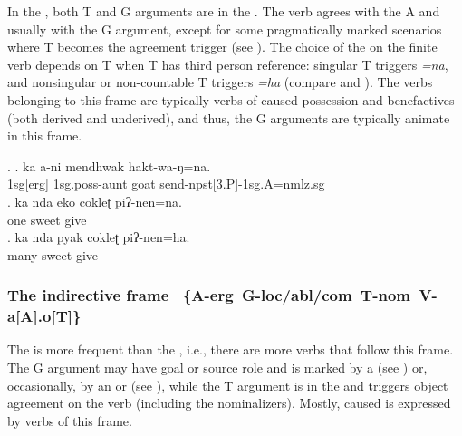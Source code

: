 
\noindent
In the , both T and G arguments are in the  . The verb agrees with the A and usually with the G argument, except for some pragmatically marked scenarios where T becomes the agreement trigger (see ). The choice of the  on the finite verb depends on T when T has third person reference: singular T triggers \emph{=na}, and nonsingular or non-countable T triggers \emph{=ha} (compare \Next[b] and \Next[c]). The verbs belonging to this frame are typically verbs of caused possession and benefactives (both derived and underived), and thus, the G arguments are typically animate in this frame.
 
\ex. \ag. ka  a-ni mendhwak hakt-wa-ŋ=na.\\
{\sc 1sg[erg]} {\sc 1sg.poss}-aunt goat send{\sc -npst[3.P]-1sg.A=nmlz.sg}\\
\newpage
\bg. ka nda eko cokleʈ piʔ-nen=na.\\
		  one sweet give\\
	\bg. ka nda pyak cokleʈ piʔ-nen=ha.\\
	  many sweet give\\

\subsubsection[The indirective frame]{The indirective frame %
\mbox{ \{A-{\sc erg}  G-{\sc loc/abl/com} T-{\sc nom} V-a[A].o[T]\}}}


\noindent
The  is more frequent than the , i.e., there are more verbs that follow this frame. The G argument may have goal or source role and is marked by a  (see \Next) or, occasionally, by an  or   (see \NNext), while the T argument is in the  and triggers object agreement on the verb (including the nominalizers). Mostly, caused  is  expressed by verbs of this frame. 

